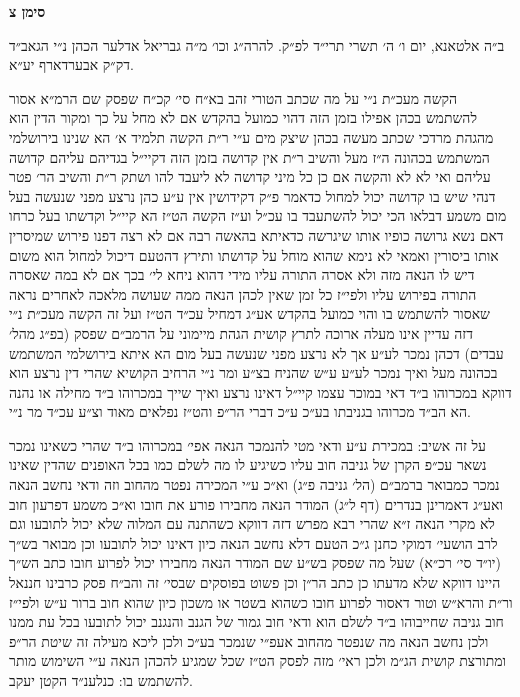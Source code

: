 \documentclass[12pt, openany]{book}
\newcommand{\chapname}{}
\newcommand{\newchap}[1]{
	\addcontentsline{toc}{chapter}{#1}
	\renewcommand{\chapname}{#1}
		\begin{center}
			\textbf{%
\fontsize{16pt}{16pt}\selectfont
				#1}
		\end{center}
}
\begin{document}
\newchap{סימן צ}
\begin{multicols}{2}
ב״ה אלטאנא, יום ו׳ ה׳ תשרי תרי״ד לפ״ק. להרה״ג וכו׳ מ״ה גבריאל אדלער הכהן נ״י הגאב״ד דק״ק אבערדארף יע״א.\\\vspace{0pt}

הקשה מעכ״ת נ״י על מה שכתב הטורי זהב בא״ח סי׳ קכ״ח שפסק שם הרמ״א אסור להשתמש בכהן אפילו בזמן הזה דהוי כמועל בהקדש אם לא מחל על כך ומקור הדין הוא מהגהת מרדכי שכתב מעשה בכהן שיצק מים ע״י ר״ת הקשה תלמיד א׳ הא שנינו בירושלמי המשתמש בכהונה ה״ז מעל והשיב ר״ת אין קדושה בזמן הזה דקיי״ל בגדיהם עליהם קדושה עליהם ואי לא לא והקשה אם כן כל מיני קדושה לא ליעבד להו ושתק ר״ת והשיב הר׳ פטר דנהי שיש בו קדושה יכול למחול כדאמר פ״ק דקידושין אין ע״ע כהן נרצע מפני שנעשה בעל מום משמע דבלאו הכי יכול להשתעבד בו עכ״ל וע״ז הקשה הט״ז הא קיי״ל וקדשתו בעל כרחו דאם נשא גרושה כופיו אותו שיגרשה כדאיתא בהאשה רבה אם לא רצה דפנו פירוש שמיסרין אותו ביסורין ואמאי לא נימא שהוא מוחל על קדושתו ותירץ דהטעם דיכול למחול הוא משום דיש לו הנאה מזה ולא אסרה התורה עליו מידי דהוא ניחא לי׳ בכך אם לא במה שאסרה התורה בפירוש עליו ולפי״ז כל זמן שאין לכהן הנאה ממה שעושה מלאכה לאחרים נראה שאסור להשתמש בו והוי כמועל בהקדש אע״ג דמחיל עכ״ד הט״ז ועל זה הקשה מעכ״ת נ״י דזה עדיין אינו מעלה ארוכה לתרץ קושית הגהת מיימוני על הרמב״ם שפסק (בפ״ג מהל׳ עבדים) דכהן נמכר לע״ע אך לא נרצע מפני שנעשה בעל מום הא איתא בירושלמי המשתמש בכהונה מעל ואיך נמכר לע״ע ע״ש שהניח בצ״ע ומר נ״י הרחיב הקושיא שהרי דין נרצע הוא דווקא במכרוהו ב״ד דאי במוכר עצמו קיי״ל דאינו נרצע ואיך שייך במכרוהו ב״ד מחילה או נהנה הא הב״ד מכרוהו בגניבתו בע״כ ע״כ דברי הר״פ והט״ז נפלאים מאוד וצ״ע עכ״ד מר נ״י.\\\vspace{0pt}

על זה אשיב: במכירת ע״ע ודאי מטי להנמכר הנאה אפי׳ במכרוהו ב״ד שהרי כשאינו נמכר נשאר עכ״פ הקרן של גניבה חוב עליו כשיגיע לו מה לשלם כמו בכל האופנים שהדין שאינו נמכר כמבואר ברמב״ם (הל׳ גניבה פ״ג) וא״כ ע״י המכירה נפטר מהחוב וזה ודאי נחשב הנאה ואע״ג דאמרינן בנדרים (דף ל״ג) המודר הנאה מחבירו פורע את חובו וא״כ משמע דפרעון חוב לא מקרי הנאה ז״א שהרי רבא מפרש דזה דווקא כשהתנה עם המלוה שלא יכול לתובעו וגם לרב הושעי׳ דמוקי כחנן ג״כ הטעם דלא נחשב הנאה כיון דאינו יכול לתובעו וכן מבואר בש״ך (יו״ד סי׳ רכ״א) שעל מה שפסק בש״ע שם המודר הנאה מחבירו יכול לפרוע חובו כתב הש״ך היינו דווקא שלא מדעתו כן כתב הר״ן וכן פשוט בפוסקים שבסי׳ זה והב״ח פסק כרבינו חננאל ור״ת והרא״ש וטור דאסור לפרוע חובו כשהוא בשטר או משכון כיון שהוא חוב ברור ע״ש ולפי״ז חוב גניבה שחייבוהו ב״ד לשלם הוא ודאי חוב גמור של הגנב והנגנב יכול לתובעו בכל עת ממנו ולכן נחשב הנאה מה שנפטר מהחוב אעפ״י שנמכר בע״כ ולכן ליכא מעילה זה שיטת הר״פ ומתורצת קושית הג״מ ולכן ראי׳ מזה לפסק הט״ז שכל שמגיע להכהן הנאה ע״י השימוש מותר להשתמש בו: כנלענ״ד הקטן יעקב.\\\vspace{0pt}

\end{multicols}\newpage
\end{document}
